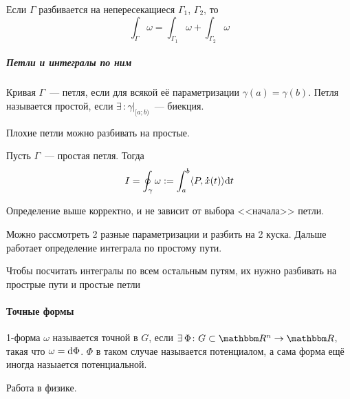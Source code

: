 \documentclass[12pt,timbord]{../../../notes}
\begin{document}
\begin{rem}
  Если $\Gamma$ разбивается на непересекащиеся $\Gamma_1$, $\Gamma_2$, то 
  \[
    \int_\Gamma \omega = \int_{\Gamma_1} \omega + \int_{\Gamma_2} \omega
  \]
\end{rem}

\subparagraph{Петли и интегралы по ним}


\begin{defn}\label{defn:lineint::defs::loop}
  Кривая $\Gamma$~--- петля, если для всякой её параметризации $\gamma(a) = \gamma(b)$. 
  Петля называется простой, если $\exists\, \colon \gamma\vert_{[a;b)}$~--- биекция.
\end{defn}
\begin{rem*}
  Плохие петли можно разбивать на простые.
\end{rem*}

\begin{defn}\label{defn:lineint::defs::loopint}
  Пусть $\Gamma$~--- простая петля. Тогда 
  \[
    I = \oint_\gamma \omega := \int_a^b \langle P,\accentset{\mbox{\bfseries .}}{x}(t)\rangle \mathrm{d} t
  \]
\end{defn}
\begin{prop}\label{prop:lineint::defs::loopint}
  Определение выше корректно, и не зависит от выбора <<начала>> петли. 
\end{prop}  
\begin{itlproof}
  Можно рассмотреть 2 разные параметризации и разбить на 2 куска. Дальше работает определение
  интеграла по простому пути.
\end{itlproof}

\begin{rem*}
  Чтобы посчитать интегралы по всем остальным путям, их нужно разбивать на прострые пути и
  простые петли
\end{rem*}


\paragraph{\underdev Точные формы}
\label{par:lineint::precforms}

\begin{defn}\label{defn:lineint::precforms::def}
  1-форма $\omega$ называется точной в $G$, если $\exists\, \Phi\colon G\subset \R^n\to \R$, такая что
  $\omega =  \mathrm{d} \Phi$. $\Phi$ в таком случае называется потенциалом, а сама форма ещё иногда
  назыается потенциальной.
\end{defn}
\begin{exmp*}
  Работа в физике.
\end{exmp*}
\end{document}
